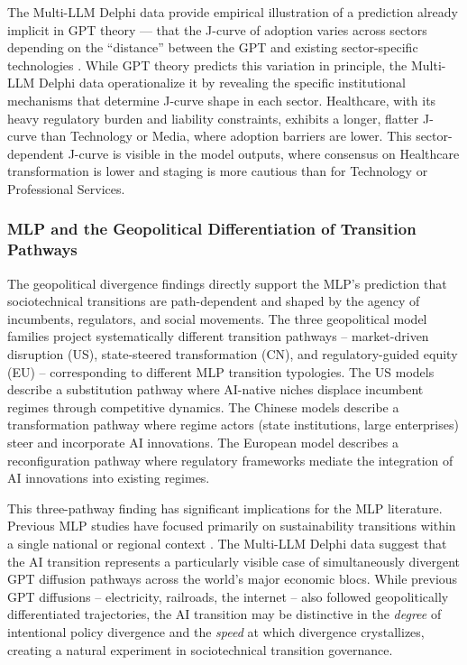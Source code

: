 \documentclass[preprint,review,12pt]{elsarticle}
\begin{document}
The Multi-LLM Delphi data provide empirical illustration of a prediction already implicit in GPT theory --- that the J-curve of adoption varies across sectors depending on the ``distance'' between the GPT and existing sector-specific technologies \citep{bresnahan1995gpt}. While GPT theory predicts this variation in principle, the Multi-LLM Delphi data operationalize it by revealing the specific institutional mechanisms that determine J-curve shape in each sector. Healthcare, with its heavy regulatory burden and liability constraints, exhibits a longer, flatter J-curve than Technology or Media, where adoption barriers are lower. This sector-dependent J-curve is visible in the model outputs, where consensus on Healthcare transformation is lower and staging is more cautious than for Technology or Professional Services.


\subsubsection{MLP and the Geopolitical Differentiation of Transition Pathways}
\label{sec:mlp_geopolitical}

The geopolitical divergence findings directly support the MLP's prediction that sociotechnical transitions are path-dependent and shaped by the agency of incumbents, regulators, and social movements. The three geopolitical model families project systematically different transition pathways -- market-driven disruption (US), state-steered transformation (CN), and regulatory-guided equity (EU) -- corresponding to different MLP transition typologies. The US models describe a substitution pathway where AI-native niches displace incumbent regimes through competitive dynamics. The Chinese models describe a transformation pathway where regime actors (state institutions, large enterprises) steer and incorporate AI innovations. The European model describes a reconfiguration pathway where regulatory frameworks mediate the integration of AI innovations into existing regimes.

This three-pathway finding has significant implications for the MLP literature. Previous MLP studies have focused primarily on sustainability transitions within a single national or regional context \citep{geels2020microfoundations, roberts2019accelerated}. The Multi-LLM Delphi data suggest that the AI transition represents a particularly visible case of simultaneously divergent GPT diffusion pathways across the world's major economic blocs. While previous GPT diffusions -- electricity, railroads, the internet -- also followed geopolitically differentiated trajectories, the AI transition may be distinctive in the \textit{degree} of intentional policy divergence and the \textit{speed} at which divergence crystallizes, creating a natural experiment in sociotechnical transition governance.
\end{document}
